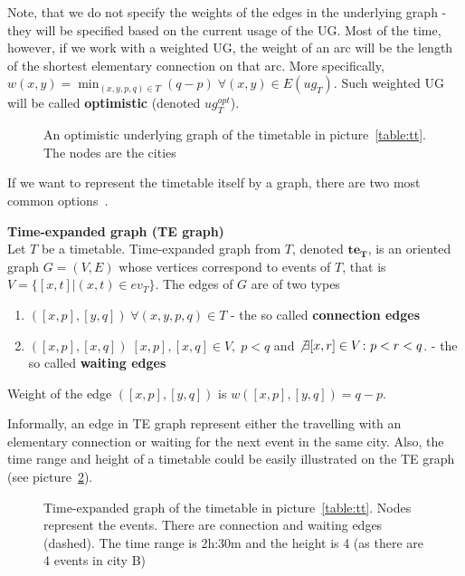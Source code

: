     \noindent Note, that we do not specify the weights of the edges in the underlying graph - they will be specified based on the current usage of the UG. Most of the time, however, if we work with a weighted UG, the weight of an arc will be the length of the shortest elementary connection on that arc. More specifically, $w(x, y) = \min_{(x, y, p, q) \in T} (q - p) \; \forall (x, y) \in E(ug_{T})$. Such weighted UG will be called \textbf{optimistic} (denoted $ug_{T}^{opt}$).
    
    \begin{figure}[h!]
        \begin{center}
        \end{center}
		\caption{\label{fig:ug} An optimistic underlying graph of the timetable in picture~\ref{table:tt}. The nodes are the \textcolor{city-clr}{cities}}
	\end{figure}
	
	\noindent If we want to represent the timetable itself by a graph, there are two most common options~\cite{timetablemodelsalgs07}.
	
	\begin{definition}
		\textbf{Time-expanded graph (TE graph)} \\
        Let $T$ be a timetable. Time-expanded graph from $T$, denoted $\bm{te_{T}}$, is an oriented graph $G = (V, E)$ whose vertices correspond to events of $T$, that is $V = \{[x, t]| (x, t) \in ev_{T}\}$. The edges of $G$ are of two types
        \begin{enumerate}
            \item $([x, p], [y, q]) \; \forall (x, y, p, q) \in T$ - the so called \textbf{connection edges}
            \item $([x, p], [x, q]) \; [x, p], [x, q] \in V, \; p < q$ and $\not \exists [x, r] \in V\colon p < r < q$. - the so called \textbf{waiting edges}
		\end{enumerate}
        Weight of the edge $([x, p], [y, q])$ is $w([x, p], [y, q]) = q - p$.
	\end{definition}
	
	\noindent Informally, an edge in TE graph represent either the travelling with an elementary connection or waiting for the next event in the same city. Also, the time range and height of a timetable could be easily illustrated on the TE graph (see picture~\ref{pic:te}). 
	
	\begin{figure}[h!]
	    \begin{center}
	    \end{center}
    	\caption{\label{pic:te} Time-expanded graph of the timetable in picture~\ref{table:tt}. Nodes represent the \textcolor{event-clr}{events}. There are \textcolor{elcon-clr}{connection} and \textcolor{waiting-clr}{waiting} edges (dashed). The time range is 2h:30m and the height is 4 (as there are 4 events in city B)}
	\end{figure}
        
